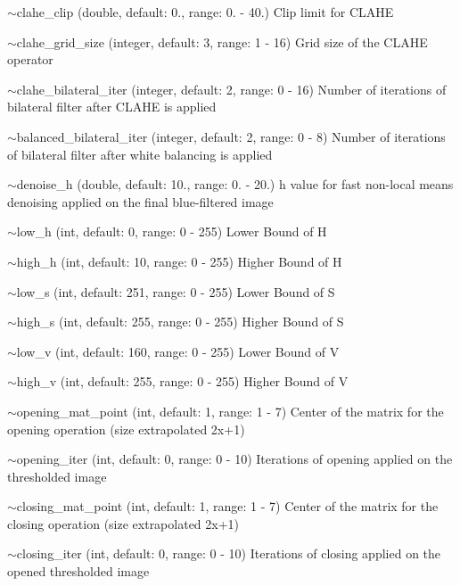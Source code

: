 \begin{DoxyItemize}
\item {\ttfamily $\sim$clahe\+\_\+clip} (double, default\+: 0., range\+: 0. -\/ 40.) Clip limit for C\+L\+A\+HE
\item {\ttfamily $\sim$clahe\+\_\+grid\+\_\+size} (integer, default\+: 3, range\+: 1 -\/ 16) Grid size of the C\+L\+A\+HE operator
\item {\ttfamily $\sim$clahe\+\_\+bilateral\+\_\+iter} (integer, default\+: 2, range\+: 0 -\/ 16) Number of iterations of bilateral filter after C\+L\+A\+HE is applied
\item {\ttfamily $\sim$balanced\+\_\+bilateral\+\_\+iter} (integer, default\+: 2, range\+: 0 -\/ 8) Number of iterations of bilateral filter after white balancing is applied
\item {\ttfamily $\sim$denoise\+\_\+h} (double, default\+: 10., range\+: 0. -\/ 20.) h value for fast non-\/local means denoising applied on the final blue-\/filtered image
\item {\ttfamily $\sim$low\+\_\+h} (int, default\+: 0, range\+: 0 -\/ 255) Lower Bound of H
\item {\ttfamily $\sim$high\+\_\+h} (int, default\+: 10, range\+: 0 -\/ 255) Higher Bound of H
\item {\ttfamily $\sim$low\+\_\+s} (int, default\+: 251, range\+: 0 -\/ 255) Lower Bound of S
\item {\ttfamily $\sim$high\+\_\+s} (int, default\+: 255, range\+: 0 -\/ 255) Higher Bound of S
\item {\ttfamily $\sim$low\+\_\+v} (int, default\+: 160, range\+: 0 -\/ 255) Lower Bound of V
\item {\ttfamily $\sim$high\+\_\+v} (int, default\+: 255, range\+: 0 -\/ 255) Higher Bound of V
\item {\ttfamily $\sim$opening\+\_\+mat\+\_\+point} (int, default\+: 1, range\+: 1 -\/ 7) Center of the matrix for the opening operation (size extrapolated 2x+1)
\item {\ttfamily $\sim$opening\+\_\+iter} (int, default\+: 0, range\+: 0 -\/ 10) Iterations of opening applied on the thresholded image
\item {\ttfamily $\sim$closing\+\_\+mat\+\_\+point} (int, default\+: 1, range\+: 1 -\/ 7) Center of the matrix for the closing operation (size extrapolated 2x+1)
\item {\ttfamily $\sim$closing\+\_\+iter} (int, default\+: 0, range\+: 0 -\/ 10) Iterations of closing applied on the opened thresholded image
\end{DoxyItemize}

